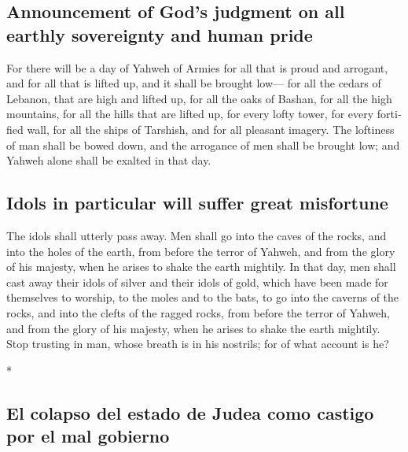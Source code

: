 \begin{paracol}{2}
\begin{otherlanguage}{english}
\hypertarget{announcement-of-gods-judgment-on-all-earthly-sovereignty-and-human-pride}{%
\subsection{Announcement of God's judgment on all earthly sovereignty
and human
pride}\label{announcement-of-gods-judgment-on-all-earthly-sovereignty-and-human-pride}}

 For there will be a day of Yahweh of Armies for all that
is proud and arrogant, and for all that is lifted up, and it shall be
brought low---  for all the cedars of Lebanon, that are
high and lifted up, for all the oaks of Bashan,  for all
the high mountains, for all the hills that are lifted up,
 for every lofty tower, for every fortified wall,
 for all the ships of Tarshish, and for all pleasant
imagery.  The loftiness of man shall be bowed down, and
the arrogance of men shall be brought low; and Yahweh alone shall be
exalted in that day.

\hypertarget{idols-in-particular-will-suffer-great-misfortune}{%
\subsection{Idols in particular will suffer great
misfortune}\label{idols-in-particular-will-suffer-great-misfortune}}

 The idols shall utterly pass away.  Men
shall go into the caves of the rocks, and into the holes of the earth,
from before the terror of Yahweh, and from the glory of his majesty,
when he arises to shake the earth mightily.  In that day,
men shall cast away their idols of silver and their idols of gold, which
have been made for themselves to worship, to the moles and to the bats,
 to go into the caverns of the rocks, and into the clefts
of the ragged rocks, from before the terror of Yahweh, and from the
glory of his majesty, when he arises to shake the earth mightily.
 Stop trusting in man, whose breath is in his nostrils;
for of what account is he?

\end{otherlanguage}

\switchcolumn[0]*

\hypertarget{el-colapso-del-estado-de-judea-como-castigo-por-el-mal-gobierno}{%
\subsection{El colapso del estado de Judea como castigo por el mal
gobierno}\label{el-colapso-del-estado-de-judea-como-castigo-por-el-mal-gobierno}}


\end{paracol}
